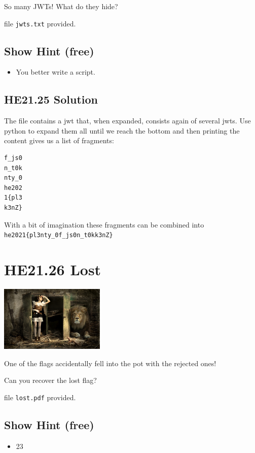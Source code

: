 \documentclass[english,a4paper,nols,noindent]{tufte-handout}
\begin{document}
\noindent So many JWTs! What do they hide?

file \verb+jwts.txt+ provided.

\subsection{Show Hint (free)}
\begin{itemize}
\item You better write a script.
\end{itemize}

\hypertarget{he21.25-solution}{%
\subsection{HE21.25 Solution}\label{he21.25-solution}}

\noindent The file contains a jwt that, when expanded, consists again of
several jwts.  Use python to expand them all until we reach the bottom and then
printing the content gives us a list of fragments:

\begin{verbatim}
f_js0
n_t0k
nty_0
he202
1{pl3
k3nZ}
\end{verbatim}

With a bit of imagination these fragments can be combined into
\verb+he2021{pl3nty_0f_js0n_t0kk3nZ}+

\hypertarget{he21.26}{%
  \section{HE21.26 Lost}
  \label{he21.26}}
\begin{marginfigure}
    \includegraphics[width=50mm]{images/challenge26.jpg}
\end{marginfigure}

\noindent One of the flags accidentally fell into the pot with the rejected ones!

Can you recover the lost flag?

file \verb+lost.pdf+ provided.

\subsection{Show Hint (free)}
\begin{itemize}
\item 23
\end{itemize}
\end{document}
